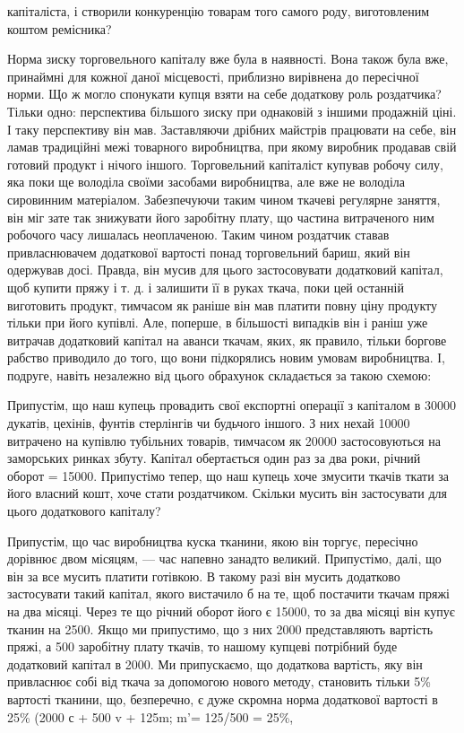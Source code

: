 \parcont{}  %
капіталіста, і створили конкуренцію товарам того самого роду, виготовленим коштом ремісника?

Норма зиску торговельного
капіталу вже була в наявності. Вона також була вже, принаймні для кожної даної місцевості, приблизно вирівнена до пересічної
норми. Що ж могло спонукати купця взяти на себе додаткову роль роздатчика? Тільки одно:  перспектива більшого зиску при
однаковій з іншими продажній ціні. І таку перспективу він мав. Заставляючи дрібних майстрів працювати на себе, він ламав
традиційні межі товарного виробництва, при якому виробник продавав свій готовий продукт і нічого іншого. Торговельний
капіталіст купував робочу силу, яка поки ще володіла своїми засобами виробництва, але вже не володіла сировинним матеріалом.
Забезпечуючи таким чином ткачеві регулярне заняття, він міг зате так знижувати його заробітну плату, що частина витраченого
ним робочого часу лишалась неоплаченою. Таким чином роздатчик ставав привласнювачем додаткової вартості понад торговельний
бариш, який він одержував досі. Правда, він мусив для цього застосовувати додатковий капітал, щоб купити пряжу і т. д. і
залишити її в руках ткача, поки цей останній виготовить продукт, тимчасом як раніше він мав платити повну ціну продукту
тільки при його купівлі. Але, поперше, в більшості випадків він і раніш уже витрачав додатковий капітал на аванси ткачам,
яких, як правило, тільки боргове рабство приводило до того, що вони підкорялись
новим умовам виробництва. І, подруге, навіть незалежно від цього обрахунок складається за такою схемою:

Припустім, що наш купець провадить свої експортні операції з капіталом в 30000 дукатів, цехінів, фунтів стерлінгів чи
будьчого іншого. З них нехай 10000 витрачено на купівлю тубільних товарів, тимчасом як 20000 застосовуються на заморських
ринках збуту. Капітал обертається один раз за два роки, річний оборот = 15000. Припустімо тепер, що наш купець хоче змусити
ткачів ткати за його власний кошт, хоче стати роздатчиком. Скільки мусить він застосувати для цього додаткового капіталу?

Припустім, що час виробництва куска тканини, якою він торгує, пересічно дорівнює двом місяцям, — час напевно занадто
великий. Припустімо, далі, що він за все мусить платити готівкою. В такому разі він мусить додатково застосувати такий
капітал, якого вистачило б на те, щоб постачити ткачам пряжі на два місяці. Через те що річний оборот його є 15000, то за
два місяці він купує тканин на 2500. Якщо ми припустимо, що з них 2000 представляють вартість пряжі, а 500 заробітну плату
ткачів, то нашому купцеві потрібний буде додатковий капітал в 2000. Ми припускаємо, що додаткова вартість, яку він
привласнює собі від ткача за допомогою нового методу, становить тільки 5\% вартості тканини, що, безперечно, є дуже скромна
норма додаткової вартості в 25\% (2000 с + 500 v + 125m; m'= 125/500 = 25\%,
\parbreak{}  %
